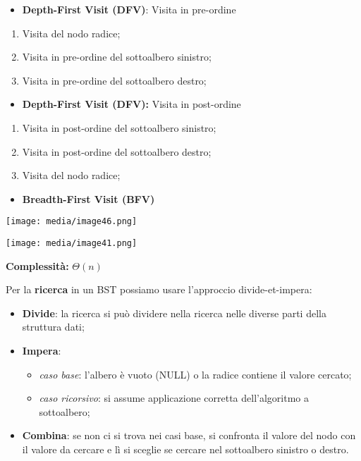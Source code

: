 \begin{itemize}
\item
  \textbf{Depth-First Visit (DFV)}: Visita in pre-ordine
\end{itemize}

\begin{enumerate}
\def\labelenumi{\arabic{enumi}.}
\item
  Visita del nodo radice;
\item
  Visita in pre-ordine del sottoalbero sinistro;
\item
  Visita in pre-ordine del sottoalbero destro;
\end{enumerate}

\begin{itemize}
\item
  \textbf{Depth-First Visit (DFV):} Visita in post-ordine
\end{itemize}

\begin{enumerate}
\def\labelenumi{\arabic{enumi}.}
\item
  Visita in post-ordine del sottoalbero sinistro;
\item
  Visita in post-ordine del sottoalbero destro;
\item
  Visita del nodo radice;
\end{enumerate}

\begin{itemize}
\item
  \textbf{Breadth-First Visit (BFV)}
\end{itemize}

\texttt{[image: media/image46.png]}

\texttt{[image: media/image41.png]}

\textbf{Complessità:} \(\Theta(n)\)

Per la \textbf{ricerca} in un BST possiamo usare l'approccio
divide-et-impera:

\begin{itemize}
\item
  \textbf{Divide}: la ricerca si può dividere nella ricerca nelle
  diverse parti della struttura dati;
\item
  \textbf{Impera}:

  \begin{itemize}
  \item
    \emph{caso base}: l'albero è vuoto (NULL) o la radice contiene il
    valore cercato;
  \item
    \emph{caso ricorsivo}: si assume applicazione corretta
    dell'algoritmo a sottoalbero;
  \end{itemize}
\item
  \textbf{Combina}: se non ci si trova nei casi base, si confronta il
  valore del nodo con il valore da cercare e lì si sceglie se cercare
  nel sottoalbero sinistro o destro.
\end{itemize}

